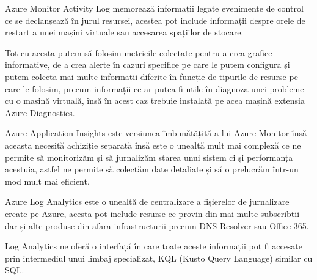 Azure Monitor Activity Log memorează informații legate evenimente de control ce se
declanșează în jurul resursei, acestea pot include informații despre orele de 
restart a unei mașini virtuale sau accesarea spațiilor de stocare.

Tot cu acesta putem să folosim metricile colectate pentru a crea grafice informative,
de a crea alerte în cazuri specifice pe care le putem configura și putem 
colecta mai multe informații diferite în funcție de tipurile de resurse pe care le folosim,
precum informații ce ar putea fi utile în diagnoza unei probleme cu o mașină virtuală,
însă în acest caz trebuie instalată pe acea mașină extensia Azure Diagnostics.

Azure Application Insights este versiunea îmbunătățită a lui Azure Monitor însă aceasta
necesită achiziție separată însă este o unealtă mult mai complexă ce ne permite să 
monitorizăm și să jurnalizăm starea unui sistem ci și performanța acestuia, astfel
ne permite să colectăm date detaliate și să o prelucrăm într-un mod mult mai eficient.

Azure Log Analytics este o unealtă de centralizare a fișierelor de jurnalizare create 
pe Azure, acesta pot include resurse ce provin din mai multe subscribții dar și alte 
produse din afara infrastructurii precum DNS Resolver sau Office 365.

Log Analytics ne oferă o interfață în care toate aceste informații pot fi accesate
prin intermediul unui limbaj specializat, KQL (Kusto Query Language) similar cu SQL.

